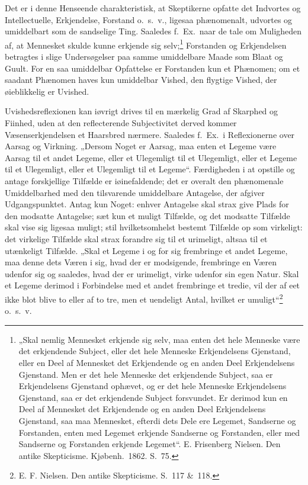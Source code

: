 \documentclass[12pt]{book}
\newcommand{\opage}[1]{\marginnote{\footnotesize\textit{[#1]}}}
\begin{document}
Det er i denne Henseende charakteristisk, at Skeptikerne opfatte det Indvortes og Intellectuelle, Erkjendelse, Forstand o.\ s.\ v., ligesaa phænomenalt, udvortes og umiddelbart som de sandselige Ting. Saaledes f.\ Ex.\ naar de tale om Muligheden af, at Mennesket skulde kunne erkjende sig selv;\footnote{„Skal nemlig Mennesket erkjende sig selv, maa enten det hele Menneske være det erkjendende Subject, eller det hele Menneske Erkjendelsens Gjenstand, eller en Deel af Mennesket det Erkjendende og en anden Deel Erkjendelsens Gjenstand. Men er det hele Menneske det erkjendende Subject, saa er Erkjendelsens Gjenstand ophævet, og er det hele Menneske Erkjendelsens Gjenstand, saa er det erkjendende Subject forsvundet. Er derimod kun en Deel af Mennesket det Erkjendende og en anden Deel Erkjendelsens Gjenstand, saa maa Mennesket, efterdi dets Dele ere Legemet, Sandserne og Forstanden, enten med Legemet erkjende Sandserne og Forstanden, eller med Sandserne og Forstanden erkjende Legemet“. E. Frisenberg Nielsen. Den antike Skepticisme. Kjøbenh.\ 1862. S.~75.}%
{} Forstanden og Erkjendelsen betragtes i slige Undersøgelser paa samme umiddelbare Maade som Blaat og Guult. For en saa umiddelbar Opfattelse er Forstanden kun et Phænomen; om et saadant Phænomen haves kun umiddelbar Vished, den flygtige Vished, der øieblikkelig er Uvished.

\opage{217}Uvishedsreflexionen kan iøvrigt drives til en mærkelig Grad af Skarphed og Fiinhed, uden at den reflecterende Subjectivitet derved kommer Væsenserkjendelsen et Haarsbred nærmere. Saaledes f.\ Ex.\ i Reflexionerne over Aarsag og Virkning. „Dersom Noget er Aarsag, maa enten et Legeme være Aarsag til et andet Legeme, eller et Ulegemligt til et Ulegemligt, eller et Legeme til et Ulegemligt, eller et Ulegemligt til et Legeme“. Færdigheden i at opstille og antage forskjellige Tilfælde er iøinefaldende; det er overalt den phænomenale Umiddelbarhed med den tilsvarende umiddelbare Antagelse, der afgiver Udgangspunktet. Antag kun Noget: enhver Antagelse skal strax give Plads for den modsatte Antagelse; sæt kun et muligt Tilfælde, og det modsatte Tilfælde skal vise sig ligesaa muligt; stil hvilketsomhelst bestemt Tilfælde op som virkeligt: det virkelige Tilfælde skal strax forandre sig til et urimeligt, altsaa til et utænkeligt Tilfælde. „Skal et Legeme i og for sig frembringe et andet Legeme, maa denne dets Væren i sig, hvad der er modsigende, frembringe en Væren udenfor sig og saaledes, hvad der er urimeligt, virke udenfor sin egen Natur. Skal et Legeme derimod i Forbindelse med et andet frembringe et tredie, vil der af eet ikke blot blive to eller af to tre, men et uendeligt Antal, hvilket er umuligt“\footnote{E. F. Nielsen. Den antike Skepticisme. S.~117 \&\ 118.}%
{} o.\ s.\ v.
\end{document}

